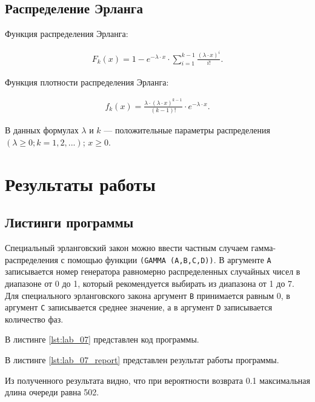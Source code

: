\documentclass{bmstu}
\begin{document}
\section{Распределение Эрланга}

Функция распределения Эрланга:

\begin{equation}
    \begin{aligned}
        F_k(x) = 1 - e^{-\lambda \cdot x} \cdot \sum_{i = 1}^{k - 1} \frac{(\lambda \cdot x)^i}{i!}.
    \end{aligned}
\end{equation}


Функция плотности распределения Эрланга:

\begin{equation}
    \begin{aligned}
        f_k(x) = \frac{\lambda \cdot (\lambda \cdot x)^{k - 1}}{(k - 1)!} \cdot e^{-\lambda \cdot x}.
    \end{aligned}
\end{equation}

В данных формулах $\lambda$ и $k$ --- положительные параметры распределения $(\lambda \geqslant 0; k = 1, 2, ...)$;
$x \geqslant 0$.


\chapter{Результаты работы}

\section{Листинги программы}

Специальный эрланговский закон можно ввести частным случаем гамма-распределения с помощью функции \texttt{(GAMMA (A,B,C,D))}. В аргументе \texttt{А} записывается номер генератора равномерно распределенных случайных чисел в диапазоне от 0 до 1, который рекомендуется выбирать из диапазона от 1 до 7. Для специального эрланговского закона аргумент \texttt{B} принимается равным 0, в аргумент \texttt{C} записывается среднее значение, а в аргумент \texttt{D} записывается количество фаз.

В листинге \ref{lst:lab_07} представлен код программы.


В листинге \ref{lst:lab_07_report} представлен результат работы программы.


Из полученного результата видно, что при вероятности возврата 0.1 максимальная длина очереди равна 502.
\end{document}
